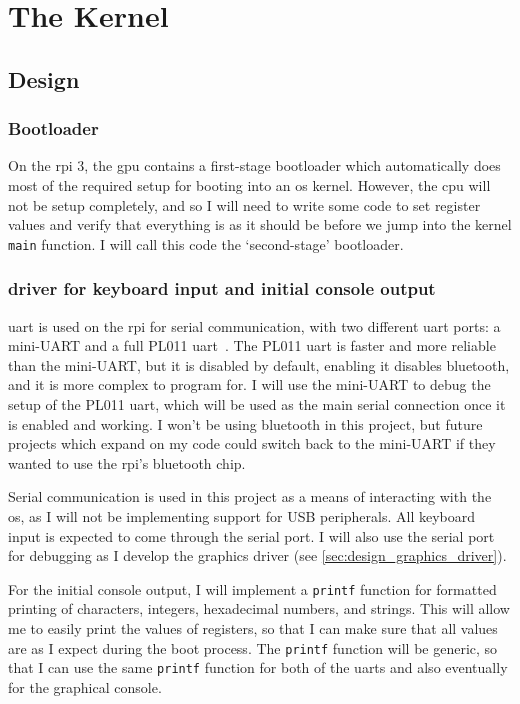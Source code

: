 \documentclass{article}
\begin{document}
\section{The Kernel}
\subsection{Design}
\label{sec:kernel_design}
\subsubsection{Bootloader}
On the \gls{rpi} 3, the \gls{gpu} contains a first-stage bootloader which
automatically does most of the required setup for booting into an \gls{os}
kernel. However, the \gls{cpu} will not be setup completely, and so I will need
to write some code to set register values and verify that everything is as it
should be before we jump into the kernel \texttt{main} function. I will call
this code the `second-stage' bootloader.

\subsubsection{\texorpdfstring{}{UART} driver for keyboard
input and initial console output}
\gls{uart} is used on the \gls{rpi} for serial communication, with two
different \gls{uart} ports: a mini-UART and a full PL011
\gls{uart}~\cite{rpi-uarts}. The PL011 \gls{uart} is faster and more reliable
than the mini-UART, but it is disabled by default, enabling it disables
bluetooth, and it is more complex to program for. I will use the mini-UART to
debug the setup of the PL011 \gls{uart}, which will be used as the main serial
connection once it is enabled and working. I won't be using bluetooth in this
project, but future projects which expand on my code could switch back to the
mini-UART if they wanted to use the \gls{rpi}'s bluetooth chip.

Serial communication is used in this project as a means of interacting with the
\gls{os}, as I will not be implementing support for USB peripherals. All
keyboard input is expected to come through the serial port. I will also use the
serial port for debugging as I develop the graphics driver (see
\autoref{sec:design_graphics_driver}).

For the initial console output, I will implement a \texttt{printf} function for
formatted printing of characters, integers, hexadecimal numbers, and strings.
This will allow me to easily print the values of registers, so that I can make
sure that all values are as I expect during the boot process. The
\texttt{printf} function will be generic, so that I can use the same
\texttt{printf} function for both of the \glspl{uart} and also eventually for
the graphical console.
\end{document}
